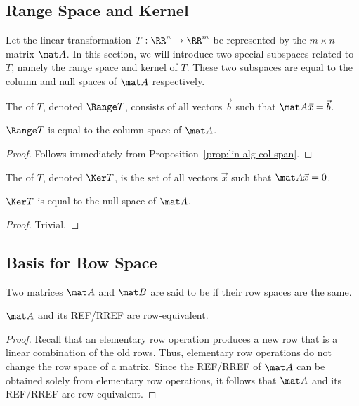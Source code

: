 \subsection{Range Space and Kernel}

Let the linear transformation $T : \RR^n \to \RR^m$ be represented by the $m \times n$ matrix $\mat A$. In this section, we will introduce two special subspaces related to $T$, namely the range space and kernel of $T$. These two subspaces are equal to the column and null spaces of $\mat A$ respectively.

\begin{definition}
    The  of $T$, denoted $\Range T$, consists of all vectors $\vec b$ such that $\mat A \vec x = \vec b$.
\end{definition}

\begin{proposition}
    $\Range T$ is equal to the column space of $\mat A$.
\end{proposition}
\begin{proof}
    Follows immediately from Proposition~\ref{prop:lin-alg-col-span}.
\end{proof}

\begin{definition}
    The  of $T$, denoted $\Ker T$, is the set of all vectors $\vec x$ such that $\mat A \vec x = 0$.
\end{definition}

\begin{proposition}
    $\Ker T$ is equal to the null space of $\mat A$.
\end{proposition}
\begin{proof}
    Trivial.
\end{proof}

\subsection{Basis for Row Space}

\begin{definition}
    Two matrices $\mat A$ and $\mat B$ are said to be  if their row spaces are the same.
\end{definition}

\begin{proposition}
    $\mat A$ and its REF/RREF are row-equivalent.
\end{proposition}
\begin{proof}
    Recall that an elementary row operation produces a new row that is a linear combination of the old rows. Thus, elementary row operations do not change the row space of a matrix. Since the REF/RREF of $\mat A$ can be obtained solely from elementary row operations, it follows that $\mat A$ and its REF/RREF are row-equivalent.
\end{proof}

